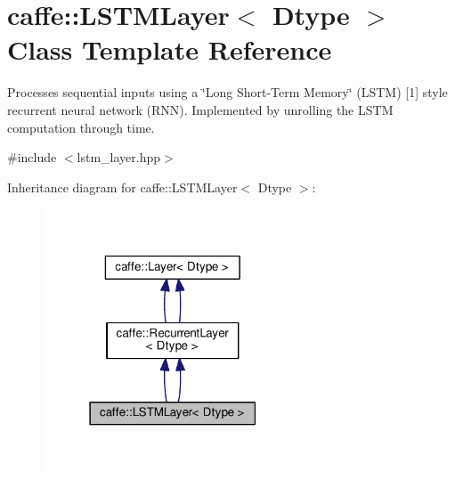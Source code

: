 \hypertarget{classcaffe_1_1_l_s_t_m_layer}{}\section{caffe\+:\+:L\+S\+T\+M\+Layer$<$ Dtype $>$ Class Template Reference}
\label{classcaffe_1_1_l_s_t_m_layer}


Processes sequential inputs using a \char`\"{}\+Long Short-\/\+Term Memory\char`\"{} (L\+S\+TM) \mbox{[}1\mbox{]} style recurrent neural network (R\+NN). Implemented by unrolling the L\+S\+TM computation through time.  




{\ttfamily \#include $<$lstm\+\_\+layer.\+hpp$>$}



Inheritance diagram for caffe\+:\+:L\+S\+T\+M\+Layer$<$ Dtype $>$\+:
\nopagebreak
\begin{figure}[H]
\begin{center}
\leavevmode
\includegraphics[width=219pt]{classcaffe_1_1_l_s_t_m_layer__inherit__graph}
\end{center}
\end{figure}
